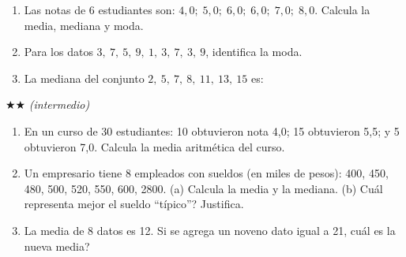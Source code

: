 \documentclass[11pt, letterpaper]{article}
\begin{document}
\begin{enumerate}[label=\textbf{\arabic*.}, leftmargin=*]
  \item Las notas de 6 estudiantes son: $4{,}0;\; 5{,}0;\; 6{,}0;\; 6{,}0;\; 7{,}0;\; 8{,}0$. Calcula la media, mediana y moda.

  \item Para los datos $3,\ 7,\ 5,\ 9,\ 1,\ 3,\ 7,\ 3,\ 9$, identifica la moda.

  \item La mediana del conjunto $2,\ 5,\ 7,\ 8,\ 11,\ 13,\ 15$ es:
  \begin{minipage}[t]{\linewidth}
  \begin{minipage}{\linewidth}\vspace{4mm}
  \end{minipage}\vspace{4mm}
  \end{minipage}
\end{enumerate}

$\bigstar\bigstar$ \textit{(intermedio)}

\begin{enumerate}[label=\textbf{\arabic*.}, leftmargin=*, resume]
  \item En un curso de 30 estudiantes: 10 obtuvieron nota 4{,}0; 15 obtuvieron 5{,}5; y 5 obtuvieron 7{,}0. Calcula la media aritm\'etica del curso.

  \item Un empresario tiene 8 empleados con sueldos (en miles de pesos): 400, 450, 480, 500, 520, 550, 600, 2800. (a) Calcula la media y la mediana. (b) \textquestiondown Cu\'al representa mejor el sueldo ``t\'ipico''? Justifica.

  \item La media de 8 datos es 12. Si se agrega un noveno dato igual a 21, \textquestiondown cu\'al es la nueva media?
\end{enumerate}
\end{document}
